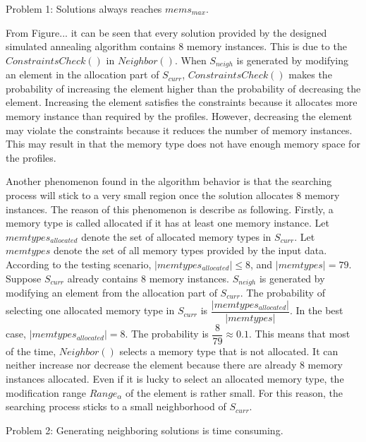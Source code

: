 		Problem 1: Solutions always reaches $mems_{max}$.
		
		From Figure... it can be seen that every solution provided by the designed
		simulated annealing algorithm contains 8 memory instances. This is due
		to the $ConstraintsCheck()$ in $Neighbor()$.
		When $S_{neigh}$ is generated by modifying an element in the allocation
		part of $S_{curr}$, $ConstraintsCheck()$ makes the probability of increasing
		the element higher than the probability of decreasing the element.
		Increasing the element satisfies the constraints because it allocates
		more memory instance than required by the profiles.
		However, decreasing the element may violate the constraints because it reduces
		the number of memory instances. This may result in that the memory type does
		not have enough memory space for the profiles.
		
		Another phenomenon found in
		the algorithm behavior is that the searching process will stick to a very small
		region once the solution allocates 8 memory instances. The reason of this
		phenomenon is describe as following. Firstly, a memory type is called allocated
		if it has at least one memory instance. Let $memtypes_{allocated}$ denote the
		set of allocated memory types in $S_{curr}$. Let $memtypes$ denote the set of
		all memory types provided by the input data. According to the testing scenario,
		$\lvert memtypes_{allocated} \rvert \leq 8$, and $\lvert memtypes \rvert = 79$.
		Suppose $S_{curr}$ already contains 8 memory instances. $S_{neigh}$ is generated
		by modifying an element from the allocation part of $S_{curr}$.
		The probability of selecting one allocated memory type in $S_{curr}$ is
		$\dfrac{\lvert memtypes_{allocated} \rvert}{\lvert memtypes \rvert}$.
		In the best case, $\lvert memtypes_{allocated} \rvert = 8$.
		The probability is $\dfrac{8}{79} \approx 0.1$. This means that most of the time,
		$Neighbor()$ selects a memory type that is not allocated. It can neither increase
		nor decrease the element because there are already 8 memory instances allocated.
		Even if it is lucky to select an allocated memory type, the modification range
		$Range_{\alpha}$ of the element is rather small. For this reason, the searching
		process sticks to a small neighborhood of $S_{curr}$.
		
		Problem 2: Generating neighboring solutions is time consuming.
		
